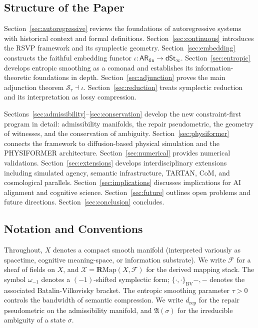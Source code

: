 \documentclass[a4paper,12pt]{article}
\theoremstyle{definition}
\newcommand{\ARfin}{\mathsf{AR}_{\mathrm{fin}}}
\newcommand{\dSt}{\mathsf{dSt}_\infty}
\newcommand{\Stau}{\mathcal{S}_\tau}
\newcommand{\iotaf}{\iota}
\newcommand{\BV}{\{\cdot,\cdot\}_{\mathrm{BV}}}
\newcommand{\X}{\mathcal{X}}
\newcommand{\dRP}{d_{\mathrm{rep}}}
\newcommand{\Amb}{\mathfrak{A}}
\begin{document}
\subsection{Structure of the Paper}

Section~\ref{sec:autoregressive} reviews the foundations of autoregressive systems with historical context and formal definitions. Section~\ref{sec:continuous} introduces the RSVP framework and its symplectic geometry. Section~\ref{sec:embedding} constructs the faithful embedding functor $\iotaf: \ARfin \to \dSt$. Section~\ref{sec:entropic} develops entropic smoothing as a comonad and establishes its information-theoretic foundations in depth. Section~\ref{sec:adjunction} proves the main adjunction theorem $\Stau \dashv \iotaf$. Section~\ref{sec:reduction} treats symplectic reduction and its interpretation as lossy compression. 

Sections~\ref{sec:admissibility}--\ref{sec:conservation} develop the new constraint-first program in detail: admissibility manifolds, the repair pseudometric, the geometry of witnesses, and the conservation of ambiguity. Section~\ref{sec:physiformer} connects the framework to diffusion-based physical simulation and the PHYSIFORMER architecture. Section~\ref{sec:numerical} provides numerical validations. Section~\ref{sec:extensions} develops interdisciplinary extensions including simulated agency, semantic infrastructure, TARTAN, CoM, and cosmological parallels. Section~\ref{sec:implications} discusses implications for AI alignment and cognitive science. Section~\ref{sec:future} outlines open problems and future directions. Section~\ref{sec:conclusion} concludes.

\subsection{Notation and Conventions}

Throughout, $X$ denotes a compact smooth manifold (interpreted variously as spacetime, cognitive meaning-space, or information substrate). We write $\mathcal{F}$ for a sheaf of fields on $X$, and $\X = \mathbf{R}\mathrm{Map}(X, \mathcal{F})$ for the derived mapping stack. The symbol $\omega_{-1}$ denotes a $(-1)$-shifted symplectic form; $\BV{-,-}$ denotes the associated Batalin-Vilkovisky bracket. The entropic smoothing parameter $\tau > 0$ controls the bandwidth of semantic compression. We write $\dRP$ for the repair pseudometric on the admissibility manifold, and $\Amb(\sigma)$ for the irreducible ambiguity of a state $\sigma$.
\end{document}

